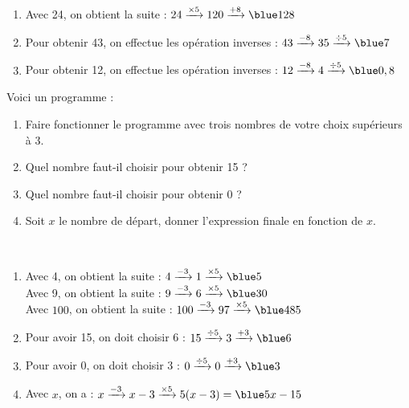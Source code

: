 \begin{colonne*exercice}
\begin{corrige}
   \ \\ [-5mm]
   \begin{enumerate}
      \item Avec 24, on obtient la suite : $24 \xrightarrow{\times5} 120 \xrightarrow{+8} \blue 128$ \smallskip
      \item Pour obtenir 43, on effectue les opération inverses : $43 \xrightarrow{-8} 35 \xrightarrow{\div5} {\blue 7}$ \smallskip
      \item Pour obtenir 12, on effectue les opération inverses : $12 \xrightarrow{-8} 4 \xrightarrow{\div5} {\blue 0,8}$
   \end{enumerate}
\end{corrige}

\medskip


\begin{exercice} %
   Voici un programme :
   \begin{center}
   \end{center}
   \begin{enumerate}
      \item Faire fonctionner le programme avec trois nombres de votre choix supérieurs à 3.
      \item Quel nombre faut-il choisir pour obtenir 15 ?
      \item Quel nombre faut-il choisir pour obtenir 0 ?
      \item Soit $x$ le nombre de départ, donner l'expression finale en fonction de $x$.
   \end{enumerate}
\end{exercice}

\begin{corrige}
   \ \\ [-5mm]
   \begin{enumerate}
      \item Avec 4, on obtient la suite : $4 \xrightarrow{-3} 1 \xrightarrow{\times5} \blue 5$ \\ \smallskip
         Avec 9, on obtient la suite : $9 \xrightarrow{-3} 6 \xrightarrow{\times5} \blue 30$ \\ \smallskip
         Avec $100$, on obtient la suite : $100 \xrightarrow{-3} 97 \xrightarrow{\times5} \blue 485$ \smallskip
      \item Pour avoir 15, on doit choisir 6 : $15 \xrightarrow{\div5} 3 \xrightarrow{+3} \blue 6$
      \item Pour avoir 0, on doit choisir 3 : $0 \xrightarrow{\div5} 0 \xrightarrow{+3} \blue 3$
      \item Avec $x$, on a : $x \xrightarrow{-3} x-3 \xrightarrow{\times5} 5(x-3) ={\blue 5x-15}$ \\
   \end{enumerate}
\end{corrige}


\end{colonne*exercice}
